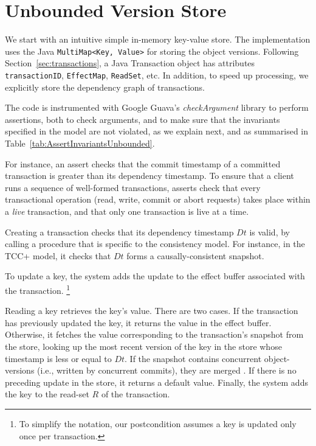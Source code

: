 \documentclass[systeme,french,english]{compas2022}
\newcommand{\commentaire}[2][fromWhom?]{%
  {%
    \color{magenta}{\bfseries\sffamily\scriptsize$\triangleright$(#1:) #2$\triangleleft$}%
  }}
\begin{document}
\section{Unbounded Version Store}


We start with an intuitive simple in-memory key-value store.
The implementation uses the Java \texttt{MultiMap<Key, Value>} for
storing the object versions.
Following Section~\ref{sec:transactions}, a Java Transaction object has
attributes \texttt{transactionID}, \texttt{EffectMap}, \texttt{ReadSet},
etc. 
In addition, to speed up processing, we explicitly store the
dependency graph of transactions.

The code is instrumented with Google Guava's \emph{checkArgument} library\cite{guava}
to perform assertions, both to check
arguments, and to make sure that the invariants specified in the model
are not violated, as we explain next, and as summarised in
Table~\ref{tab:AssertInvariantsUnbounded}.

For instance, an assert checks that the commit timestamp of a committed
transaction is greater than its dependency timestamp.
To ensure that a client runs a sequence of well-formed transactions,
asserts check that every transactional operation (read, write, commit or
abort requests) takes place within a \emph{live} transaction, and that
only one transaction is live at a time.

Creating a transaction checks that its dependency timestamp $Dt$ is
valid, by calling a procedure that is specific to the consistency model.
For instance, in the TCC+ model, it checks that $Dt$ forms a
causally-consistent snapshot.

To update a key, the system adds the update to the effect buffer
associated with the transaction.%
%
\footnote{
%
  To simplify the notation, our postcondition assumes a key is updated
  only once per transaction.
}
%

Reading a key retrieves the key's value.
There are two cases.
If the transaction has previously updated the key, it returns the value
in the effect buffer.
Otherwise, it fetches the value corresponding to the transaction's
snapshot from the store, looking up the most recent version of the key
in the store whose timestamp is less or equal to $\mathit{Dt}$.
If the snapshot contains concurrent object-versions (i.e., written by
concurrent commits), they are merged \cite{syn:rep:sh143}.
If there is no preceding update in the store, it returns a default
value.
Finally, the system adds the key to the read-set $R$ of the transaction. 
\end{document}
